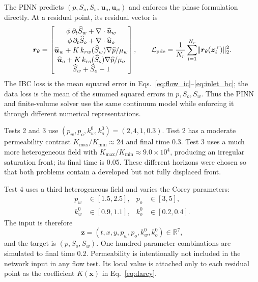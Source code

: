 The PINN predicts \((p,S_o,S_w,\boldsymbol u_o,\boldsymbol u_w)\) and enforces the phase formulation directly. At a residual point, its residual vector is
\begin{equation}
\boldsymbol r_\theta=
\begin{bmatrix}
\phi\,\partial_t\widehat S_w+\nabla\cdot\widehat{\boldsymbol u}_w\\
\phi\,\partial_t\widehat S_o+\nabla\cdot\widehat{\boldsymbol u}_o\\
\widehat{\boldsymbol u}_w+K\,k_{rw}(\widehat S_w)\nabla\widehat p/\mu_w\\
\widehat{\boldsymbol u}_o+K\,k_{ro}(\widehat S_o)\nabla\widehat p/\mu_o\\
\widehat S_w+\widehat S_o-1
\end{bmatrix},
\qquad
\mathcal{L}_{\mathrm{pde}}=\frac{1}{N_r}\sum_{i=1}^{N_r}
\lVert\boldsymbol r_\theta(\boldsymbol z_i^{,r})\rVert_2^2.
\label{eq:flow_pinn_residual}
\end{equation}
The IBC loss is the mean squared error in Eqs.~\eqref{eq:flow_ic}--\eqref{eq:inlet_bc}; the data loss is the mean of the summed squared errors in \(p,S_o,S_w\). Thus the PINN and finite-volume solver use the same continuum model while enforcing it through different numerical representations.

Tests 2 and 3 use \((p_w,p_o,k_w^0,k_o^0)=(2,4,1,0.3)\). Test 2 has a moderate permeability contrast \(K_{\max}/K_{\min}\approx24\) and final time 0.3. Test 3 uses a much more heterogeneous field with \(K_{\max}/K_{\min}\approx 9.0\times10^4\), producing an irregular saturation front; its final time is 0.05. These different horizons were chosen so that both problems contain a developed but not fully displaced front.

Test 4 uses a third heterogeneous field and varies the Corey parameters:
\begin{equation}
\begin{aligned}
    p_w&\in[1.5,2.5], &p_o&\in[3,5],\\
    k_w^0&\in[0.9,1.1], &k_o^0&\in[0.2,0.4].
\end{aligned}
\end{equation}
The input is therefore
\begin{equation}
    \boldsymbol z=(t,x,y,p_w,p_o,k_w^0,k_o^0)\in\mathbb R^7,
\end{equation}
and the target is \((p,S_o,S_w)\). One hundred parameter combinations are simulated to final time 0.2. Permeability is intentionally not included in the network input in any flow test. Its local value is attached only to each residual point as the coefficient \(K(\boldsymbol x)\) in Eq.~\eqref{eq:darcy}.

